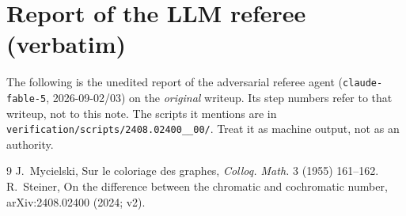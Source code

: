 \documentclass[11pt,a4paper]{article}
\theoremstyle{plain}
\theoremstyle{definition}
\theoremstyle{remark}
\begin{document}
\section{Report of the LLM referee (verbatim)}\label{app:referee}

\begin{tcolorbox}[colback=gray!8,colframe=gray!50,boxrule=0.4pt,arc=2pt]
\small The following is the unedited report of the adversarial referee agent (\texttt{claude-fable-5}, 2026-09-02/03) on the \emph{original} writeup. Its step numbers refer to that writeup, not to this note. The scripts it mentions are in \texttt{verification/scripts/2408.02400\_\_00/}. Treat it as machine output, not as an authority.
\end{tcolorbox}



\begin{thebibliography}{9}
 J.~Mycielski, Sur le coloriage des graphes, \emph{Colloq. Math.} 3 (1955) 161--162.
 R.~Steiner, On the difference between the chromatic and cochromatic number, arXiv:2408.02400 (2024; v2).
\end{thebibliography}
\end{document}
